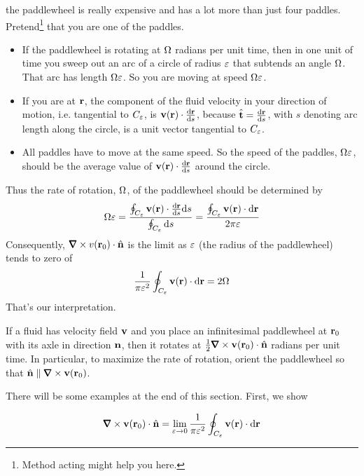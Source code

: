 the paddlewheel is really expensive and has a lot more than just four
paddles. Pretend\footnote{Method acting might help you here.} that you are one of the paddles. 
\begin{itemize}
\item
If the paddlewheel is rotating at $\Omega$ radians per unit time, then in one 
unit of time you sweep out an arc of a circle of radius $\varepsilon$ that subtends 
an angle $\Omega$. That arc has length $\Omega\varepsilon$. So you are moving at speed 
$\Omega \varepsilon$. 
\item
If you are at $\mathbf{r}$, the component of the fluid velocity in your direction of motion, i.e. tangential to $C_\varepsilon$, is $\vv(\vr)\cdot\diff{\vr}{s}$,
because $\hvt=\diff{\vr}{s}$, with $s$ denoting arc length along the circle, 
is a unit vector tangential to $C_\varepsilon$. 
\item
All paddles have to move at the same speed. So the speed of the 
paddles, $\Omega\varepsilon$, should be the average value of $\vv(\vr)\cdot\diff{\vr}{s}$ around the circle.
\end{itemize}
Thus the rate of rotation, $\Omega$, of the  paddlewheel should be
determined by
\begin{align*}
\Om \veps 
&= \frac{\oint_{C_\veps} \vv(\vr)\cdot\diff{\vr}{s}\dee{s}}
              {\oint_{C_\veps}\dee{s}} 
= \frac{\oint_{C_\veps} \vv(\vr)\cdot\dee{\vr}}
              {2\pi\veps} \\
\end{align*}
Consequently, $\vnabla\times v(\vr_0)\cdot \hn$ is the limit
as $\varepsilon$ (the radius of the paddlewheel) tends to zero of
\begin{align*}
\frac{1}{\pi\varepsilon^2}
         \oint_{C_\varepsilon} \mathbf{v}(\mathbf{r})\cdot \mathrm{d}\mathbf{r}
=2\Omega
\end{align*}
That's our interpretation.
\begin{impeqn}\label{eq:curlInterp}
If a fluid has velocity field $\mathbf{v}$ and you place an infinitesimal
paddlewheel at $\mathbf{r}_0$ with its axle in direction $\mathbf{n}$, then it rotates
at $\frac{1}{2}\vnabla\times \vv(\vr_0)\cdot \hn$ radians per unit time.
In particular, to maximize the rate of rotation, orient the paddlewheel so that
$\hn\parallel\vnabla\times \vv(\vr_0)$.
\end{impeqn}

There will be some examples at the end of this section.
First, we show

\begin{lemma}\label{lem:curlInterp}
\begin{equation*}
\vnabla\times \vv(\vr_0)\cdot \hn
=\lim_{\veps\rightarrow 0}\frac{1}{\pi\veps^2}
         \oint_{C_\veps} \vv(\vr)\cdot \dee{\vr}
\end{equation*}
\end{lemma}

